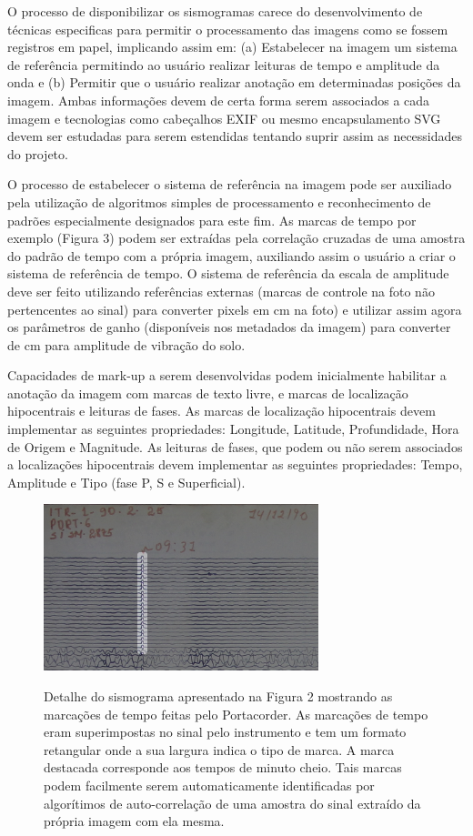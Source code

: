 \documentclass{article}
\begin{document}
O processo de disponibilizar os sismogramas carece do desenvolvimento
de técnicas especificas para permitir o processamento das imagens como
se fossem registros em papel, implicando assim em: (a) Estabelecer na
imagem um sistema de referência permitindo ao usuário realizar
leituras de tempo e amplitude da onda e (b) Permitir que o usuário
realizar anotação em determinadas posições da imagem. Ambas
informações devem de certa forma serem associados a cada imagem e
tecnologias como cabeçalhos EXIF ou mesmo encapsulamento SVG devem ser
estudadas para serem estendidas tentando suprir assim as necessidades
do projeto. 




O processo de estabelecer o sistema de referência na imagem pode ser
auxiliado pela utilização de algoritmos simples de processamento e
reconhecimento de padrões especialmente designados para este fim. As
marcas de tempo por exemplo (Figura 3) podem ser extraídas pela
correlação cruzadas de uma amostra do padrão de tempo com a própria
imagem, auxiliando assim o usuário a criar o sistema de referência de
tempo. O sistema de referência da escala de amplitude deve ser feito
utilizando referências externas (marcas de controle na foto não
pertencentes ao sinal) para converter pixels em cm na foto) e utilizar
assim agora os parâmetros de ganho (disponíveis nos metadados da
imagem) para converter de cm para amplitude de vibração do solo.

Capacidades de mark-up a serem desenvolvidas podem inicialmente
habilitar a anotação da imagem com marcas de texto livre, e marcas de
localização hipocentrais e leituras de fases. As marcas de localização
hipocentrais devem implementar as seguintes propriedades: Longitude,
Latitude, Profundidade, Hora de Origem e  Magnitude. As leituras de
fases, que podem ou não serem associados a localizações hipocentrais
devem implementar as seguintes propriedades: Tempo, Amplitude e Tipo
(fase P, S e Superficial).

\begin{figure}
  \begin{center}
    \includegraphics{detalhe.png}
    \label{detalhe}
    \caption{Detalhe do sismograma apresentado na Figura 2 mostrando as marcações
      de tempo feitas pelo Portacorder. As marcações de tempo eram
      superimpostas no sinal pelo instrumento e tem um formato retangular
      onde a sua largura indica o tipo de marca. A marca destacada
      corresponde aos tempos de minuto cheio. Tais marcas podem facilmente
      serem automaticamente identificadas por algorítimos de
      auto-correlação de uma amostra do sinal extraído da própria imagem
      com ela mesma.}
  \end{center}
\end{figure}
\end{document}
